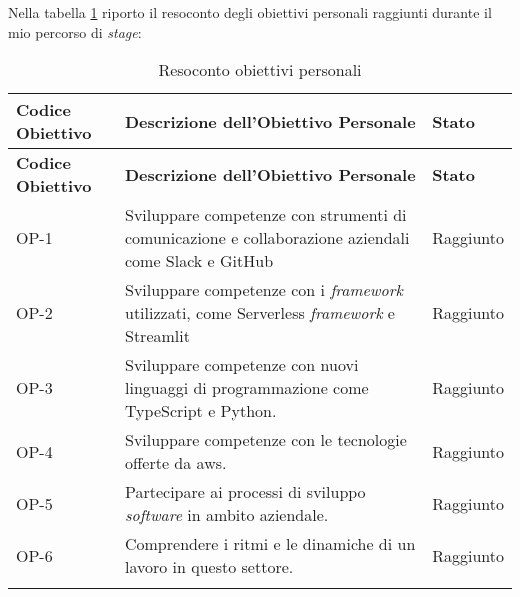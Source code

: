 Nella tabella \ref{tab:resocontoobiettiviPersonali} riporto il resoconto degli obiettivi personali raggiunti durante il mio percorso di \textit{stage}:
\renewcommand{\arraystretch}{2}
\begin{longtable}{|p{2cm}|p{6.5cm}|p{1.7cm}|}
    \hline
    \rowcolor{tableheader}\textbf{Codice Obiettivo} & \textbf{Descrizione dell'Obiettivo Personale} & \textbf{Stato} \\
    \hline
    \endfirsthead

    \rowcolor{tableheader}\textbf{Codice Obiettivo} & \textbf{Descrizione dell'Obiettivo Personale} & \textbf{Stato} \\
    \hline
    \endhead

    \hline
    \endfoot

    \hline
    \endlastfoot
    \rowcolor{tableoddrow} OP-1 & Sviluppare competenze con strumenti di comunicazione e collaborazione aziendali come Slack e GitHub & Raggiunto \\
    \hline
    \rowcolor{tableevenrow} OP-2 & Sviluppare competenze con i \textit{framework} utilizzati, come Serverless \textit{framework} e Streamlit & Raggiunto \\
    \hline
    \rowcolor{tableoddrow} OP-3 & Sviluppare competenze con nuovi linguaggi di programmazione come TypeScript e Python. & Raggiunto \\
    \hline
    \rowcolor{tableevenrow} OP-4 & Sviluppare competenze con le tecnologie offerte da \gls{aws}. & Raggiunto \\
    \hline
    \rowcolor{tableoddrow} OP-5 & Partecipare ai processi di sviluppo \textit{software} in ambito aziendale. & Raggiunto \\
    \hline
    \rowcolor{tableevenrow} OP-6 & Comprendere i ritmi e le dinamiche di un lavoro in questo settore. & Raggiunto \\
    \hline
    \caption{Resoconto obiettivi personali}
    \label{tab:resocontoobiettiviPersonali}
\end{longtable}



